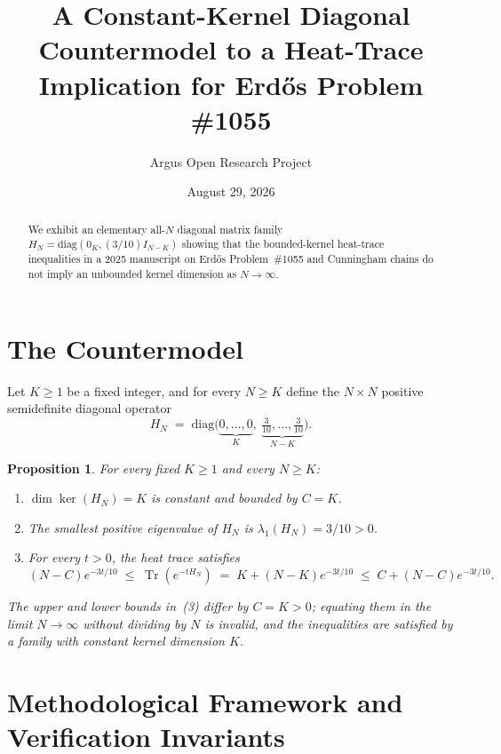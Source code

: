 \documentclass[10pt,reqno]{amsart}
\title[Countermodel to a Heat-Trace Implication for Erd\H{o}s Problem \#1055]
{A Constant-Kernel Diagonal Countermodel to a Heat-Trace Implication for Erd\H{o}s Problem \#1055}
\author{Argus Open Research Project}
\date{August 29, 2026}
\newtheorem{proposition}[theorem]{Proposition}
\theoremstyle{definition}
\begin{document}
\begin{abstract}
We exhibit an elementary all-$N$ diagonal matrix family $H_N=\mathrm{diag}(0_K,(3/10)I_{N-K})$ showing that the bounded-kernel heat-trace inequalities in a 2025 manuscript on Erd\H{o}s Problem~\#1055 and Cunningham chains do not imply an unbounded kernel dimension as $N\to\infty$.
\end{abstract}
\maketitle
\section{The Countermodel}
Let $K\ge 1$ be a fixed integer, and for every $N\ge K$ define the $N\times N$ positive semidefinite diagonal operator
\[
  H_N \;=\; \mathrm{diag}\bigl(\underbrace{0,\dots,0}_{K},\ \underbrace{\tfrac{3}{10},\dots,\tfrac{3}{10}}_{N-K}\bigr).
\]
\begin{proposition}
For every fixed $K\ge 1$ and every $N\ge K$:
\begin{enumerate}[label=\textup{(\arabic*)}]
  \item $\dim\ker(H_N) = K$ is constant and bounded by $C=K$.
  \item The smallest positive eigenvalue of $H_N$ is $\lambda_1(H_N) = 3/10 > 0$.
  \item For every $t>0$, the heat trace satisfies
  \[
    (N-C)e^{-3t/10} \;\le\; \operatorname{Tr}(e^{-t H_N}) \;=\; K + (N-K)e^{-3t/10} \;\le\; C + (N-C)e^{-3t/10}.
  \]
\end{enumerate}
The upper and lower bounds in~(3) differ by $C=K>0$; equating them in the limit $N\to\infty$ without dividing by $N$ is invalid, and the inequalities are satisfied by a family with constant kernel dimension $K$.
\end{proposition}

\section{Methodological Framework and Verification Invariants}
\end{document}
